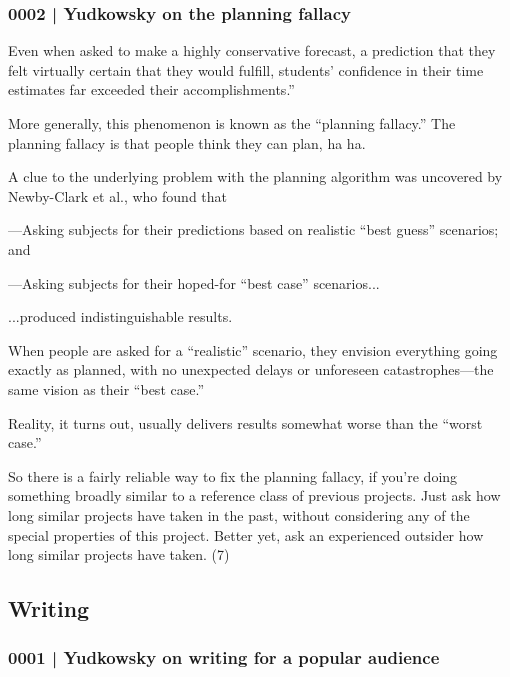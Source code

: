 		\subsubsection{0002 | Yudkowsky on the planning fallacy}
			\label{GM-LIFE-REASONING-0002}
			
			Even when asked to make a highly conservative forecast, a prediction that they felt virtually certain that they would fulfill, students' confidence in their time estimates far exceeded their accomplishments.''

			More generally, this phenomenon is known as the ``planning fallacy.'' The planning fallacy is that people think they can plan, ha ha.

			A clue to the underlying problem with the planning algorithm was uncovered by Newby-Clark et al., who found that

			---Asking subjects for their predictions based on realistic ``best guess'' scenarios; and

			---Asking subjects for their hoped-for ``best case'' scenarios...

			...produced indistinguishable results.

			When people are asked for a ``realistic'' scenario, they envision everything going exactly as planned, with no unexpected delays or unforeseen catastrophes---the same vision as their ``best case.''

			Reality, it turns out, usually delivers results somewhat worse than the ``worst case.''

			So there is a fairly reliable way to fix the planning fallacy, if you're doing something broadly similar to a reference class of previous projects. Just ask how long similar projects have taken in the past, without considering any of the special properties of this project. Better yet, ask an experienced outsider how long similar projects have taken. (7)
			
	\subsection{Writing} %
		\label{GM-LIFE-WRITING}
		
		\subsubsection{0001 | Yudkowsky on writing for a popular audience}
			\label{GM-LIFE-WRITING-0001}
			
